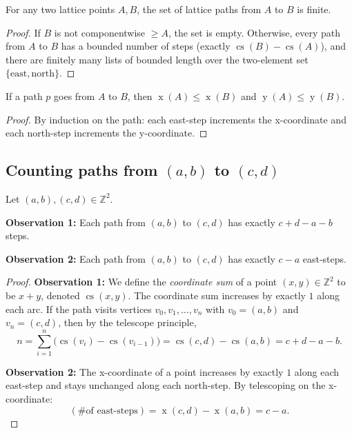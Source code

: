 \begin{lemma}
\label{lem.lgv.paths-finite}
\leanhelper
\leanok
For any two lattice points $A, B$, the set of lattice paths from $A$ to $B$ is finite.
\end{lemma}

\begin{proof}
\leanok
If $B$ is not componentwise $\ge A$, the set is empty.
Otherwise, every path from $A$ to $B$ has a bounded number of steps
(exactly $\operatorname{cs}(B) - \operatorname{cs}(A)$),
and there are finitely many lists of bounded length over the two-element set
$\{\text{east}, \text{north}\}$.
\end{proof}

\begin{lemma}
\label{lem.lgv.path-coords-nondecreasing}
\leanhelper
\leanok
If a path $p$ goes from $A$ to $B$, then $\operatorname{x}(A) \le \operatorname{x}(B)$
and $\operatorname{y}(A) \le \operatorname{y}(B)$.
\end{lemma}

\begin{proof}
\leanok
By induction on the path: each east-step increments the x-coordinate and each
north-step increments the y-coordinate.
\end{proof}

\subsection{Counting paths from $(a,b)$ to $(c,d)$}

\begin{lemma}
\label{lem.lgv.path-step-count}
\leanhelper
\leanok
Let $(a,b), (c,d) \in \mathbb{Z}^2$.

\textbf{Observation 1:} Each path from $(a,b)$ to $(c,d)$
has exactly $c+d-a-b$ steps.

\textbf{Observation 2:} Each path from $(a,b)$ to $(c,d)$
has exactly $c-a$ east-steps.
\end{lemma}

\begin{proof}
\textbf{Observation 1:} We define the \emph{coordinate sum} of a
point $(x,y) \in \mathbb{Z}^{2}$ to be $x+y$, denoted
$\operatorname{cs}(x,y)$. The coordinate sum increases by exactly $1$
along each arc. If the path visits vertices $v_0, v_1, \ldots, v_n$ with
$v_0 = (a,b)$ and $v_n = (c,d)$, then by the telescope principle,
\[
  n = \sum_{i=1}^n \bigl(\operatorname{cs}(v_i) - \operatorname{cs}(v_{i-1})\bigr)
    = \operatorname{cs}(c,d) - \operatorname{cs}(a,b) = c + d - a - b.
\]

\textbf{Observation 2:} The x-coordinate of a point increases by
exactly $1$ along each east-step and stays unchanged along each
north-step. By telescoping on the x-coordinate:
\[
  (\text{\# of east-steps}) = \operatorname{x}(c,d) - \operatorname{x}(a,b) = c - a.
\]
\end{proof}

